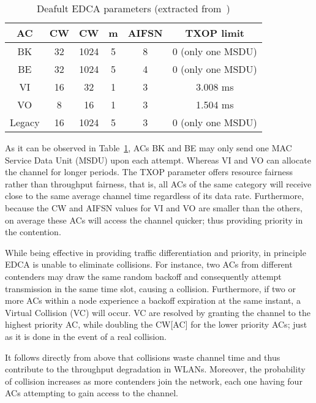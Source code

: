 \documentclass[a4paper]{article}
\begin{document}
	\begin{table}[t]
		\centering
		\caption{Deafult EDCA parameters (extracted from~\cite{perahia2013next})}
		\label{tab:EDCAparams}
		\begin{tabular}{|c|c|c|c|c|c|}
			\hline
			{\bfseries AC} & {\bfseries CW} & {\bfseries CW} &		{\bfseries m}		& {\bfseries AIFSN} & {\bfseries TXOP limit}\\
			\hline
			BK 		       & 		32			&		1024		   &			5			& 		8		  &		0 (only one MSDU)\\
BE 		       & 		32			&		1024		   &			5			& 		4		  &		0 (only one MSDU)	\\
VI 		       & 		16			&		32		  	   &			1			& 		3		  &		3.008 ms		\\
VO 		       & 		8			&		16		  	   &			1			& 		3		  &		1.504 ms		\\
Legacy	       & 		16			&		1024	  	   &			5			& 		3		  &		0 (only one MSDU)\\
			\hline
		\end{tabular}
	\end{table}

As it can be observed in Table~\ref{tab:EDCAparams}, ACs BK and BE may only send one MAC Service Data Unit (MSDU) upon each attempt. Whereas VI and VO can allocate the channel for longer periods. The TXOP parameter offers resource fairness rather than throughput fairness, that is, all ACs of the same category will receive close to the same average channel time regardless of its data rate. Furthermore, because the CW and AIFSN values for VI and VO are smaller than the others, on average these ACs will access the channel quicker; thus providing priority in the contention. 



While being effective in providing traffic differentiation and priority, in principle EDCA is unable to eliminate collisions. For instance, two ACs from different contenders may draw the same random backoff and consequently attempt transmission in the same time slot, causing a collision. Furthermore, if two or more ACs within a node experience a backoff expiration at the same instant, a Virtual Collision (VC) will occur. VC are resolved by granting the channel to the highest priority AC, while doubling the CW[AC] for the lower priority ACs; just as it is done in the event of a real collision.

It follows directly from above that collisions waste channel time and thus contribute to the throughput degradation in WLANs. Moreover, the probability of collision increases as more contenders join the network, each one having four ACs attempting to gain access to the channel.
\end{document}
